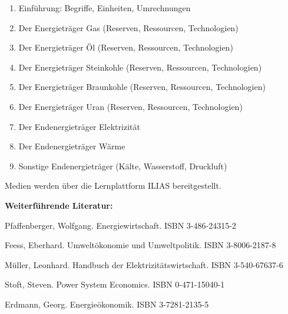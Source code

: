 \begin{course}
\begin{content}
\begin{enumerate}\item Einführung: Begriffe, Einheiten, Umrechnungen  \item Der Energieträger Gas (Reserven, Ressourcen, Technologien)  \item Der Energieträger Öl (Reserven, Ressourcen, Technologien)  \item Der Energieträger Steinkohle (Reserven, Ressourcen, Technologien)  \item Der Energieträger Braunkohle (Reserven, Ressourcen, Technologien)  \item Der Energieträger Uran (Reserven, Ressourcen, Technologien)  \item Der Endenergieträger Elektrizität  \item Der Endenergieträger Wärme  \item Sonstige Endenergieträger (Kälte, Wasserstoff, Druckluft)  \end{enumerate}
\end{content}

\begin{media}Medien werden über die Lernplattform ILIAS bereitgestellt.

\end{media}

\begin{literature}\textbf{Weiterführende Literatur:}

 

Pfaffenberger, Wolfgang. Energiewirtschaft. ISBN 3-486-24315-2

 

Feess, Eberhard. Umweltökonomie und Umweltpolitik. ISBN 3-8006-2187-8

 

Müller, Leonhard. Handbuch der Elektrizitätswirtschaft. ISBN 3-540-67637-6

 

Stoft, Steven. Power System Economics. ISBN 0-471-15040-1

 

Erdmann, Georg. Energieökonomik. ISBN 3-7281-2135-5

\end{literature}



\end{course}